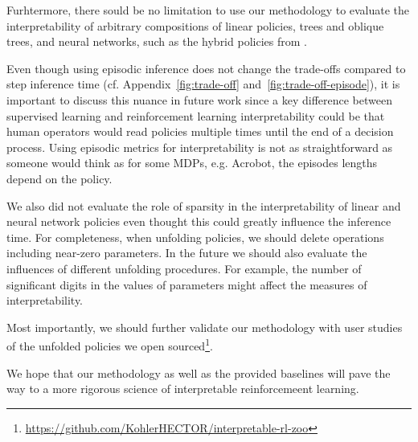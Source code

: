 Furhtermore, there sould be no limitation to use our methodology to evaluate the interpretability of arbitrary compositions of linear policies, trees and oblique trees, and neural networks, such as the hybrid policies from \cite{shindo2024blendrl}.

Even though using episodic inference does not change the trade-offs compared to step inference time (cf. Appendix~\ref{fig:trade-off} and~\ref{fig:trade-off-episode}), it is important to discuss this nuance in future work since a key difference between supervised learning and reinforcement learning interpretability could be that human operators would read policies multiple times until the end of a decision process.
Using episodic metrics for interpretability is not as straightforward as someone would think as for some MDPs, e.g. Acrobot, the episodes lengths depend on the policy.

We also did not evaluate the role of sparsity in the interpretability of linear and neural network policies even thought this could greatly influence the inference time.
For completeness, when unfolding policies, we should delete operations including near-zero parameters. 
In the future we should also evaluate the influences of different unfolding procedures.
For example, the number of significant digits in the values of parameters might affect the measures of interpretability.

Most importantly, we should further validate our methodology with user studies of the unfolded policies we open sourced\footnote{\url{https://github.com/KohlerHECTOR/interpretable-rl-zoo}}.

We hope that our methodology as well as the provided baselines will pave the way to a more rigorous science of interpretable reinforcemeent learning.
